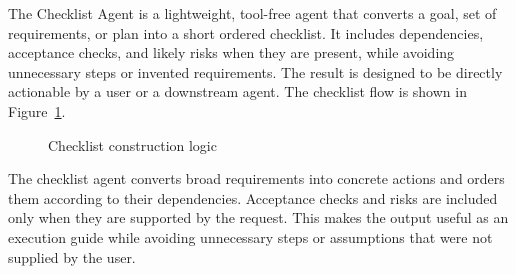 The Checklist Agent is a lightweight, tool-free agent that converts a goal,
set of requirements, or plan into a short ordered checklist. It includes
dependencies, acceptance checks, and likely risks when they are present, while
avoiding unnecessary steps or invented requirements. The result is designed
to be directly actionable by a user or a downstream agent.
The checklist flow is shown in Figure~\ref{fig:checklist-logic}.
\begin{figure}[H]\centering
{}
\caption{Checklist construction logic}
\label{fig:checklist-logic}
\end{figure}
The checklist agent converts broad requirements into concrete actions and orders them according to their dependencies. Acceptance checks and risks are included only when they are supported by the request. This makes the output useful as an execution guide while avoiding unnecessary steps or assumptions that were not supplied by the user.

\clearpage
{}

